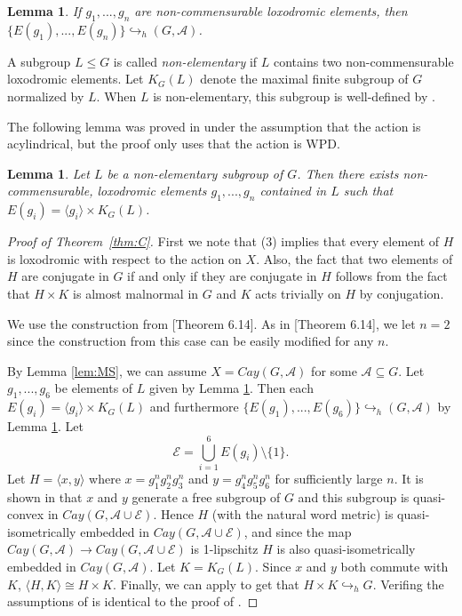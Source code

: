 \documentclass[11pt,letterpaper]{amsart}
\newtheorem{lem}[thm]{Lemma}
\theoremstyle{definition}
\theoremstyle{remark}
\newcommand{\Ga }{Cay(G, \mathcal A)}
\newcommand{\h}{\hookrightarrow _h }
\begin{document}
\begin{lem}\cite[Corollary 3.17]{H}\label{L1}
If $g_1,..., g_n$ are non-commensurable loxodromic elements, then $\{E(g_1),..., E(g_n)\}\h (G, \mathcal A)$.
\end{lem}


A subgroup $L\leq G$ is called \emph{non-elementary} if $L$ contains two non-commensurable loxodromic elements. Let $K_G(L)$ denote the maximal finite subgroup of $G$ normalized by $L$. When $L$ is non-elementary, this subgroup is well-defined by \cite[Lemma 5.5]{H}.



The following lemma was proved in \cite{H} under the assumption that the action is acylindrical, but the proof only uses that the action is WPD.

\begin{lem}\cite[Lemma 5.6]{H}\label{L2}
Let $L$ be a non-elementary subgroup of $G$. Then there exists non-commensurable, loxodromic elements $g_1,..., g_n$ contained in $L$ such that $E(g_i)=\langle g_i\rangle\times K_G(L)$.
\end{lem}



\begin{proof}[Proof of Theorem~\ref{thm:C}]
First we note that (3) implies that every element of $H$ is loxodromic with respect to the action on $X$. Also, the fact that two elements of $H$ are conjugate in $G$ if and only if they are conjugate in $H$ follows from the fact that $H\times K$ is almost malnormal in $G$ and $K$ acts trivially on $H$ by conjugation.


We  use the construction from [Theorem 6.14]\cite{DGO}. As in  [Theorem 6.14]\cite{DGO}, we let $n=2$ since the construction from this case can be easily modified for any $n$.

By Lemma \ref{lem:MS}, we can assume $X=\Ga$ for some $\mathcal A\subseteq G$. Let $g_1,..., g_6$ be elements of $L$ given by Lemma \ref{L2}. Then each $E(g_i)=\langle g_i\rangle\times K_G(L)$ and furthermore $\{E(g_1),...,E(g_6)\}\h (G, \mathcal A)$ by Lemma \ref{L1}. Let $$\mathcal E=\bigcup_{i=1}^6 E(g_i)\setminus\{1\}.$$ Let $H=\langle x, y\rangle$ where  $x=g_1^ng_2^ng_3^n$ and $y=g_4^ng_5^ng_6^n$ for sufficiently large $n$. It is shown in \cite{DGO} that $x$ and $y$ generate a free subgroup of $G$ and this subgroup is quasi-convex in $Cay(G, \mathcal A\cup\mathcal E)$. Hence $H$ (with the natural word metric) is quasi-isometrically embedded in $Cay(G, \mathcal A\cup\mathcal E)$, and since the map $\Ga\to Cay(G, \mathcal A\cup\mathcal E)$ is 1-lipschitz $H$ is also quasi-isometrically embedded in $\Ga$. Let $K=K_G(L)$. Since $x$ and $y$ both commute with $K$, $\langle H, K\rangle \cong H\times K$. Finally, we can apply \cite[Theorem 4.42]{DGO} to get that $H\times K\h G$. Verifing the assumptions of \cite[Theorem 4.42]{DGO} is identical to the proof of \cite[Theorem 6.14]{DGO}.
\end{proof}
\end{document}
